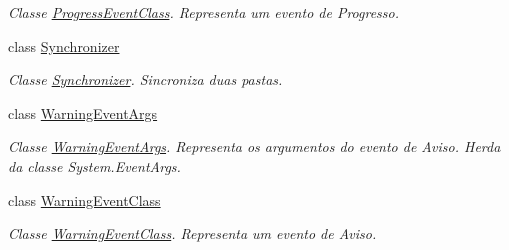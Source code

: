 \begin{DoxyCompactItemize}
\begin{DoxyCompactList}\small\item\em Classe \hyperlink{classSpartacus_1_1Utils_1_1ProgressEventClass}{Progress\+Event\+Class}. Representa um evento de Progresso. \end{DoxyCompactList}\item 
class \hyperlink{classSpartacus_1_1Utils_1_1Synchronizer}{Synchronizer}
\begin{DoxyCompactList}\small\item\em Classe \hyperlink{classSpartacus_1_1Utils_1_1Synchronizer}{Synchronizer}. Sincroniza duas pastas. \end{DoxyCompactList}\item 
class \hyperlink{classSpartacus_1_1Utils_1_1WarningEventArgs}{Warning\+Event\+Args}
\begin{DoxyCompactList}\small\item\em Classe \hyperlink{classSpartacus_1_1Utils_1_1WarningEventArgs}{Warning\+Event\+Args}. Representa os argumentos do evento de Aviso. Herda da classe System.\+Event\+Args. \end{DoxyCompactList}\item 
class \hyperlink{classSpartacus_1_1Utils_1_1WarningEventClass}{Warning\+Event\+Class}
\begin{DoxyCompactList}\small\item\em Classe \hyperlink{classSpartacus_1_1Utils_1_1WarningEventClass}{Warning\+Event\+Class}. Representa um evento de Aviso. \end{DoxyCompactList}\end{DoxyCompactItemize}
